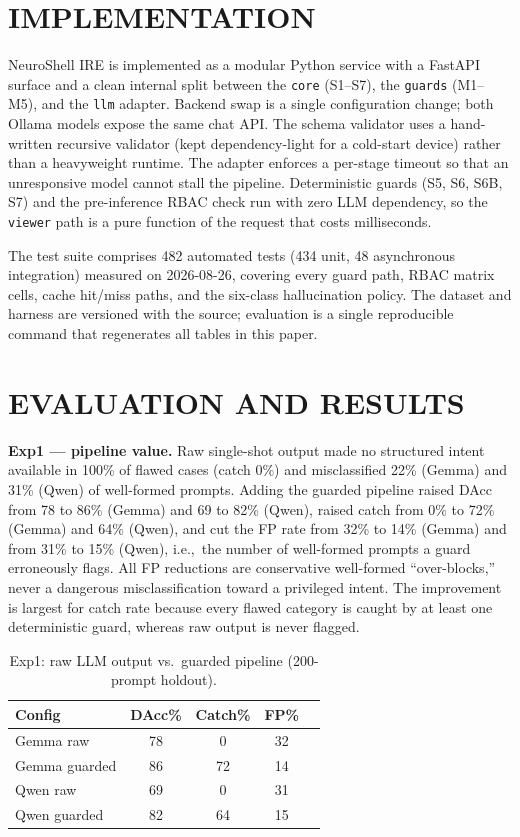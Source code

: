\documentclass[conference]{IEEEtran}
\begin{document}
\section{IMPLEMENTATION}
NeuroShell IRE is implemented as a modular Python service with a FastAPI surface and a clean internal split between the \texttt{core} (S1--S7), the \texttt{guards} (M1--M5), and the \texttt{llm} adapter. Backend swap is a single configuration change; both Ollama models expose the same chat API. The schema validator uses a hand-written recursive validator (kept dependency-light for a cold-start device) rather than a heavyweight runtime. The adapter enforces a per-stage timeout so that an unresponsive model cannot stall the pipeline. Deterministic guards (S5, S6, S6B, S7) and the pre-inference RBAC check run with zero LLM dependency, so the \texttt{viewer} path is a pure function of the request that costs milliseconds.

The test suite comprises 482 automated tests (434 unit, 48 asynchronous integration) measured on 2026-08-26, covering every guard path, RBAC matrix cells, cache hit/miss paths, and the six-class hallucination policy. The dataset and harness are versioned with the source; evaluation is a single reproducible command that regenerates all tables in this paper.

\section{EVALUATION AND RESULTS}\label{sec:results}
\textbf{Exp1 --- pipeline value.} Raw single-shot output made no structured intent available in 100\% of flawed cases (catch $0\%$) and misclassified 22\% (Gemma) and 31\% (Qwen) of well-formed prompts. Adding the guarded pipeline raised DAcc from 78 to 86\% (Gemma) and 69 to 82\% (Qwen), raised catch from $0\%$ to 72\% (Gemma) and 64\% (Qwen), and cut the FP rate from 32\% to 14\% (Gemma) and from 31\% to 15\% (Qwen), i.e.,\ the number of well-formed prompts a guard erroneously flags. All FP reductions are conservative well-formed ``over-blocks,'' never a dangerous misclassification toward a privileged intent. The improvement is largest for catch rate because every flawed category is caught by at least one deterministic guard, whereas raw output is never flagged.

\begin{table}[!t]
\centering
\caption{Exp1: raw LLM output vs.\ guarded pipeline (200-prompt holdout).}
\label{tab:exp1}
\setlength{\tabcolsep}{4pt}
\small
\begin{tabular}{@{}lcccc@{}}
\toprule
\textbf{Config} & \textbf{DAcc\%} & \textbf{Catch\%} & \textbf{FP\%} \\
\midrule
Gemma raw         & 78 & 0  & 32 \\
Gemma guarded     & 86 & 72 & 14 \\
Qwen raw          & 69 & 0  & 31 \\
Qwen guarded      & 82 & 64 & 15 \\
\bottomrule
\end{tabular}
\end{table}
\end{document}
